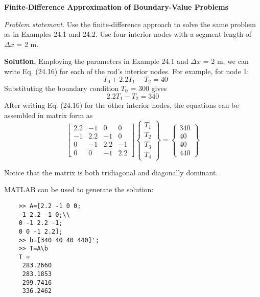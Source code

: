 \documentclass[../main.tex]{subfiles}
\begin{document}
\begin{exmp}
    \textbf{Finite-Difference Approximation of Boundary-Value Problems}

    \noindent\textit{Problem statement.} Use the finite-difference approach to solve the same problem as in
    Examples 24.1 and 24.2. Use four interior nodes with a segment length of $\Delta x$ = 2 m.\vspace{\medskipamount}

    \noindent\textbf{Solution.} Employing the parameters in Example 24.1 and $\Delta x$ = 2 m, we can write 
    Eq. (24.16) for each of the rod's interior nodes. For example, for node 1:
    $$
    -T_0+2.2T_1-T_2=40
    $$
    Substituting the boundary condition $T_0$ = 300 gives
    $$
    2.2T_1-T_2=340
    $$
    After writing Eq. (24.16) for the other interior nodes, the equations can be assembled in
    matrix form as 
    \begin{equation} \nonumber
        \left[\begin{array}{cccc}
        2.2 & -1 & 0 & 0 \\
        -1 & 2.2 & -1 & 0 \\
        0 & -1 & 2.2 & -1 \\
        0 & 0 & -1 & 2.2
        \end{array}\right]\left\{\begin{array}{l}
        T_{1} \\
        T_{2} \\
        T_{3} \\
        T_{4}
        \end{array}\right\}=\left\{\begin{array}{c}
        340 \\
        40 \\
        40 \\
        440
        \end{array}\right\}
    \end{equation}

    Notice that the matrix is both tridiagonal and diagonally dominant.

    MATLAB can be used to generate the solution:\vspace*{\smallskipamount}
    \begin{lstlisting}
    >> A=[2.2 -1 0 0;
    -1 2.2 -1 0;\\
    0 -1 2.2 -1;
    0 0 -1 2.2];
    >> b=[340 40 40 440]';
    >> T=A\b
    T =
     283.2660
     283.1853
     299.7416
     336.2462
    \end{lstlisting}
    
\end{exmp}
\end{document}
